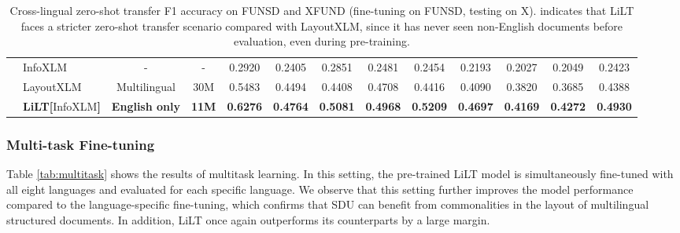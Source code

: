 \documentclass[11pt]{article}
\begin{document}
\begin{table*}[!]
{\begin{tabular}{@{}clccccccccccc@{}}
& InfoXLM            &     -    &   -            &  0.2920& 0.2405 &0.2851 &0.2481 &0.2454& 0.2193 &0.2027 &0.2049 &0.2423  \\
& LayoutXLM         &    Multilingual     &    30M           &  0.5483& 0.4494& 0.4408 &0.4708 &0.4416 &0.4090 &0.3820& 0.3685 &0.4388  \\
\cmidrule(l){2-13} 
& \textbf{LiLT[}InfoXLM\textbf{]}             &     \textbf{English only}    &   \textbf{11M}           &    \textbf{0.6276}                   &     \textbf{0.4764}               &    \textbf{0.5081}                 &     \textbf{0.4968}            & \textbf{0.5209}               &   \textbf{0.4697}             &   \textbf{0.4169  }              &  \textbf{0.4272 }         &  \textbf{0.4930 }  \\ \bottomrule 
\end{tabular}}
\caption{Cross-lingual zero-shot transfer F1 accuracy  on FUNSD and XFUND (fine-tuning on FUNSD, testing on X). 
 indicates that LiLT faces a  stricter zero-shot transfer scenario compared with LayoutXLM, since it has never seen non-English documents before evaluation, even during pre-training.}
\label{tab:zero-shot}
\end{table*}
\subsubsection{Multi-task Fine-tuning}

Table \ref{tab:multitask} shows  the results of multitask learning. In this setting, the pre-trained LiLT model is simultaneously fine-tuned with all eight languages  and evaluated for each specific language.
We observe that this setting further improves the model performance compared to the language-specific fine-tuning, which confirms that SDU  can benefit from commonalities in the layout  of multilingual structured documents.
In addition, LiLT once again outperforms its counterparts by a large margin.
\end{document}
